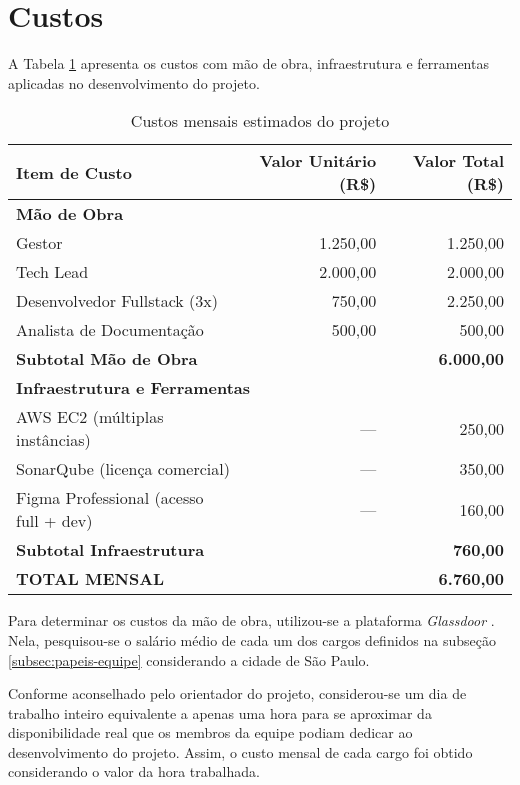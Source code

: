 \section{Custos}

\label{sec:custos}

A Tabela \ref{tab:custo-mensal-projeto} apresenta os custos com mão de obra, infraestrutura e ferramentas aplicadas no desenvolvimento do projeto.

\begin{table}[htbp]
	\centering
	\caption{Custos mensais estimados do projeto}
	\label{tab:custo-mensal-projeto}
	\begin{tabular}{lrr}
		\toprule
		\textbf{Item de Custo} & \textbf{Valor Unitário (R\$)} & \textbf{Valor Total (R\$)} \\
		\midrule
		\multicolumn{3}{l}{\textbf{Mão de Obra}} \\
		\quad Gestor & 1.250,00 & 1.250,00 \\
		\quad Tech Lead & 2.000,00 & 2.000,00 \\
		\quad Desenvolvedor Fullstack (3x) & 750,00 & 2.250,00 \\
		\quad Analista de Documentação & 500,00 & 500,00 \\
		\cmidrule{3-3}
		\multicolumn{2}{l}{\textbf{Subtotal Mão de Obra}} & \textbf{6.000,00} \\
		\midrule
		\multicolumn{3}{l}{\textbf{Infraestrutura e Ferramentas}} \\
		\quad AWS EC2 (múltiplas instâncias) & --- & 250,00 \\
		\quad SonarQube (licença comercial) & --- & 350,00 \\
		\quad Figma Professional (acesso full + dev) & --- & 160,00 \\
		\cmidrule{3-3}
		\multicolumn{2}{l}{\textbf{Subtotal Infraestrutura}} & \textbf{760,00} \\
		\midrule
		\multicolumn{2}{l}{\textbf{TOTAL MENSAL}} & \textbf{6.760,00} \\
		\bottomrule
	\end{tabular}
\end{table}

Para determinar os custos da mão de obra, utilizou-se a plataforma \emph{Glassdoor} \cite{glassdoor-2025}. Nela, pesquisou-se o salário médio de cada um dos cargos definidos na subseção \ref{subsec:papeis-equipe} considerando a cidade de São Paulo.

Conforme aconselhado pelo orientador do projeto, considerou-se um dia de trabalho inteiro equivalente a apenas uma hora para se aproximar da disponibilidade real que os membros da equipe podiam dedicar ao desenvolvimento do projeto. Assim, o custo mensal de cada cargo foi obtido considerando o valor da hora trabalhada.

